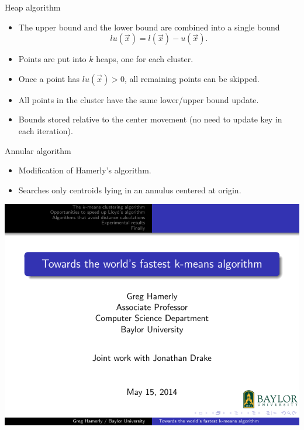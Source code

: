 \documentclass[10pt, compress]{beamer}
\newcommand{\x}{\vec{x}}
\newcommand{\lx}{l(\x)}
\newcommand{\ux}{u(\x)}
\newcommand{\lux}{lu(\x)}
\begin{document}
\begin{frame}{Heap algorithm}
  \begin{itemize}
    \item The upper bound and the lower bound are combined into a single bound $$\lux = \lx - \ux.$$
    \item Points are put into $k$ heaps, one for each cluster.
    \item Once a point has $\lux > 0$, all remaining points can be skipped.
    \item All points in the cluster have the same lower/upper bound update.
    \item Bounds stored relative to the center movement (no need to update key in each iteration).
  \end{itemize}
\end{frame}

\begin{frame}{Annular algorithm}
  \begin{itemize}
    \item Modification of Hamerly's algorithm.
    \item Searches only centroids lying in an annulus centered at origin.
  \end{itemize}
  \begin{center}
    \includegraphics[scale=1.2, page=32, trim=8.7cm 2.5cm 0.8cm 3.8cm, clip]{files/fast_kmeans_talk_20140515.pdf}
  \end{center}
\end{frame}
\end{document}
